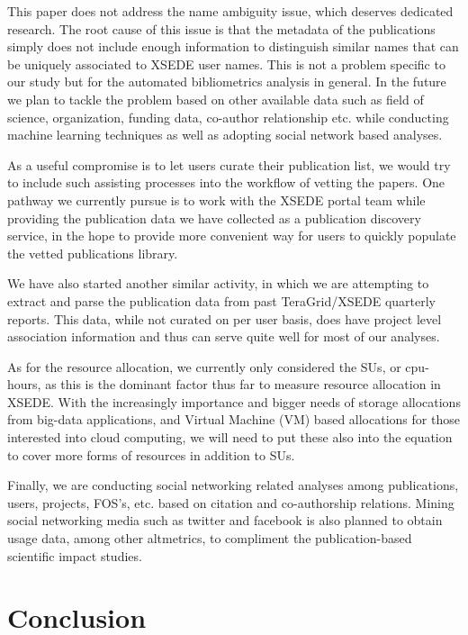 \documentclass{sig-alternate}
\begin{document}
This paper does not address the name ambiguity issue, which deserves dedicated research. The root cause of this issue is that the metadata of the publications simply does not include enough information to distinguish similar names that can be uniquely associated to XSEDE user names. This is not a problem specific to our study but for the automated bibliometrics analysis in general. In the future we plan to tackle the problem based on other available data such as field of science, organization, funding data, co-author relationship etc. while conducting machine learning techniques as well as adopting social network based analyses.

As a useful compromise is to let users curate their publication list, we would try to include such assisting processes into the workflow of vetting the papers. One pathway we currently pursue is to work with the XSEDE portal team while providing the publication data we have collected as a publication discovery service, in the hope to provide more convenient way for users to quickly populate the vetted publications library.

We have also started another similar activity, in which we are attempting to extract and parse the publication data from past TeraGrid/XSEDE quarterly reports. This data, while not curated on per user basis, does have project level association information and thus can serve quite well for most of our analyses.

As for the resource allocation, we currently only considered the SUs, or cpu-hours, as this is the dominant factor thus far to measure resource allocation in XSEDE. With the increasingly importance and bigger needs of storage allocations from big-data applications, and Virtual Machine (VM) based allocations for those interested into cloud computing, we will need to put these also into the equation to cover more forms of resources in addition to SUs.

Finally, we are conducting social networking related analyses among publications, users, projects, FOS's, etc. based on citation and co-authorship relations. Mining social networking media such as twitter and facebook is also planned to obtain usage data, among other altmetrics, to compliment the publication-based scientific impact studies.

\section{Conclusion} \label{S:conclusion}
\end{document}
